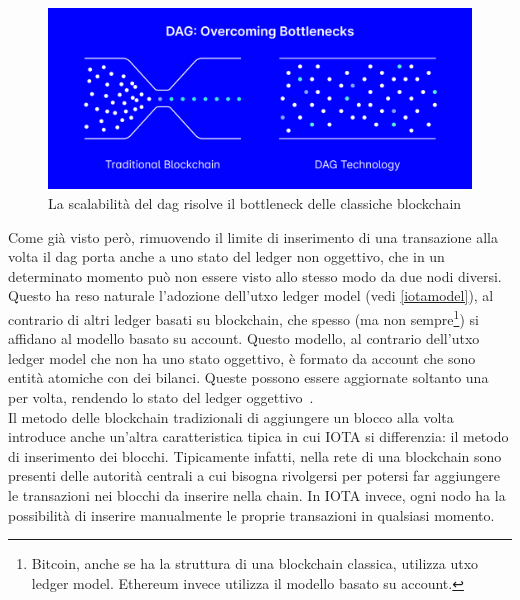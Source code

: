 \documentclass[12pt,a4paper,openright,twoside]{report}
\begin{document}
\begin{figure}[h]
\begin{center}
\includegraphics[width=\textwidth]{figures/blockchain_bottleneck.png}
\caption[Blockchain bottleneck]{La scalabilità del \acrshort{dag} risolve il bottleneck delle \linebreak classiche blockchain\footnotemark}\label{fig:blockchain_bottleneck}
\end{center}
\end{figure}
\label{accountmodel}
Come già visto però, rimuovendo il limite di inserimento di una transazione alla volta il \acrshort{dag} porta anche a uno stato del ledger non oggettivo, che in un determinato momento può non essere visto allo stesso modo da due nodi diversi. Questo ha reso naturale l'adozione dell'\acrshort{utxo} ledger model (vedi \ref{iotamodel}), al contrario di altri ledger basati su blockchain, che spesso (ma non sempre\footnote{Bitcoin, anche se ha la struttura di una blockchain classica, utilizza \acrshort{utxo} ledger model. Ethereum invece utilizza il modello basato su account.}) si affidano al modello basato su account. Questo modello, al contrario dell'\acrshort{utxo} ledger model che non ha uno stato oggettivo, è formato da account che sono entità atomiche con dei bilanci. Queste possono essere aggiornate soltanto una per volta, rendendo lo stato del ledger oggettivo~\cite{smartcontracts}.\\
Il metodo delle blockchain tradizionali di aggiungere un blocco alla volta introduce anche un'altra caratteristica tipica in cui IOTA si differenzia: il metodo di inserimento dei blocchi. Tipicamente infatti, nella rete di una blockchain sono presenti delle autorità centrali a cui bisogna rivolgersi per potersi far aggiungere le transazioni nei blocchi da inserire nella chain. In IOTA invece, ogni nodo ha la possibilità di inserire manualmente le proprie transazioni in qualsiasi momento.\\
\end{document}

